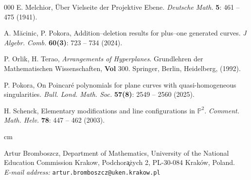 \documentclass[12pt]{article}
\theoremstyle{plain}
\theoremstyle{definition}
\begin{document}
\begin{thebibliography}{000}
E. Melchior, \"Uber Vielseite der Projektive Ebene. \textit{Deutsche Math.} \textbf{5}: 461 -- 475 (1941).

A. M\u acinic, P. Pokora, Addition–deletion results for plus--one generated curves. \textit{J Algebr. Comb.} \textbf{60(3)}: 723 -- 734 (2024).

P. Orlik, H. Terao, \textit{Arrangements of Hyperplanes}. Grundlehren der Mathematischen Wissenschaften, \textbf{Vol} 300. Springer, Berlin, Heidelberg, (1992).

P. Pokora, On Poincar\'e polynomials for plane curves with quasi-homogeneous singularities. \textit{Bull. Lond. Math. Soc.} \textbf{57(8)}: 2549 -- 2560 (2025).

 H. Schenck, Elementary modifications and line configurations in $\mathbb{P}^2$. \textit{Comment. Math. Helv.} \textbf{78}: 447 -- 462 (2003).

\end{thebibliography}

 cm

\bigskip
Artur Bromboszcz,
Department of Mathematics,
University of the National Education Commission Krakow,
Podchor\c a\.zych 2,
PL-30-084 Krak\'ow, Poland. \\
\nopagebreak
\textit{E-mail address:} \texttt{artur.bromboszcz@uken.krakow.pl}
\end{document}
